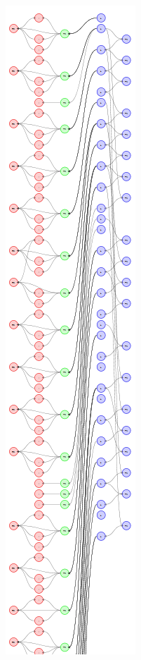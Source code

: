 \begin{figure}
\begin{minipage}[b]{.30\textwidth}
  \includegraphics[scale=0.5]{./figures/speechacts/twitter.png}  
\end{minipage}
\begin{minipage}[b]{.30\textwidth}
  \centering

\end{minipage}
\end{figure}

